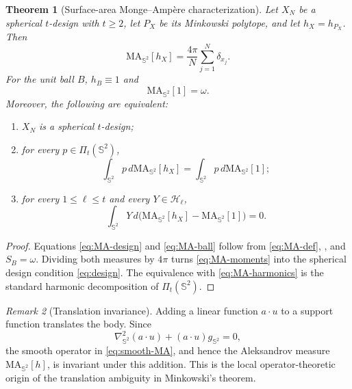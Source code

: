 \documentclass[11pt]{article}
\newtheorem{theorem}{Theorem}[section]
\theoremstyle{definition}
\theoremstyle{remark}
\newtheorem{remark}[theorem]{Remark}
\newcommand{\Sph}{\mathbb S}
\newcommand{\Harm}{\mathcal H}
\newcommand{\MA}{\mathrm{MA}}
\begin{document}
\begin{theorem}[Surface-area Monge--Amp\`ere characterization]\label{thm:MA-char}
Let $X_N$ be a spherical $t$-design with $t\ge2$, let $P_X$ be its Minkowski polytope, and let $h_X=h_{P_X}$. Then
\begin{equation}\label{eq:MA-design}
\MA_{\Sph^2}[h_X]=\frac{4\pi}{N}\sum_{j=1}^N\delta_{x_j}.
\end{equation}
For the unit ball $B$, $h_B\equiv1$ and
\begin{equation}\label{eq:MA-ball}
\MA_{\Sph^2}[1]=\omega.
\end{equation}
Moreover, the following are equivalent:
\begin{enumerate}[label=(\roman*)]
\item $X_N$ is a spherical $t$-design;
\item for every $p\in\Pi_t(\Sph^2)$,
\begin{equation}\label{eq:MA-moments}
\int_{\Sph^2}p\,d\MA_{\Sph^2}[h_X]
=\int_{\Sph^2}p\,d\MA_{\Sph^2}[1];
\end{equation}
\item for every $1\le\ell\le t$ and every $Y\in\Harm_\ell$,
\begin{equation}\label{eq:MA-harmonics}
\int_{\Sph^2}Y\,d\bigl(\MA_{\Sph^2}[h_X]-\MA_{\Sph^2}[1]\bigr)=0.
\end{equation}
\end{enumerate}
\end{theorem}

\begin{proof}
Equations \eqref{eq:MA-design} and \eqref{eq:MA-ball} follow from \eqref{eq:MA-def}, , and $S_B=\omega$. Dividing both measures by $4\pi$ turns \eqref{eq:MA-moments} into the spherical design condition \eqref{eq:design}. The equivalence with \eqref{eq:MA-harmonics} is the standard harmonic decomposition of $\Pi_t(\Sph^2)$.
\end{proof}

\begin{remark}[Translation invariance]\label{rem:MA-translation}
Adding a linear function $a\cdot u$ to a support function translates the body. Since
\[
\nabla^2_{\Sph^2}(a\cdot u)+(a\cdot u)g_{\Sph^2}=0,
\]
the smooth operator in \eqref{eq:smooth-MA}, and hence the Aleksandrov measure $\MA_{\Sph^2}[h]$, is invariant under this addition. This is the local operator-theoretic origin of the translation ambiguity in Minkowski's theorem.
\end{remark}
\end{document}
